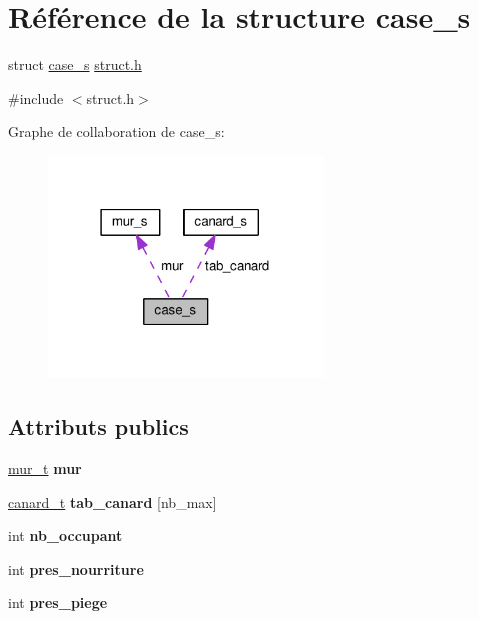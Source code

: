 \hypertarget{structcase__s}{}\section{Référence de la structure case\+\_\+s}
\label{structcase__s}


struct \hyperlink{structcase__s}{case\+\_\+s} \hyperlink{struct_8h_source}{struct.\+h}  




{\ttfamily \#include $<$struct.\+h$>$}



Graphe de collaboration de case\+\_\+s\+:
\nopagebreak
\begin{figure}[H]
\begin{center}
\leavevmode
\includegraphics[width=207pt]{structcase__s__coll__graph}
\end{center}
\end{figure}
\subsection*{Attributs publics}
\begin{DoxyCompactItemize}
\item 
\hyperlink{structmur__s}{mur\+\_\+t} {\bfseries mur}\hypertarget{structcase__s_abdc07d37e4d9b61e001331ade6b389ea}{}\label{structcase__s_abdc07d37e4d9b61e001331ade6b389ea}

\item 
\hyperlink{structcanard__s}{canard\+\_\+t} {\bfseries tab\+\_\+canard} \mbox{[}nb\+\_\+max\mbox{]}\hypertarget{structcase__s_aae0820a1cce02a09249c9078bd50d4e8}{}\label{structcase__s_aae0820a1cce02a09249c9078bd50d4e8}

\item 
int {\bfseries nb\+\_\+occupant}\hypertarget{structcase__s_a3afb11c4122087e0686451fbaefebb2e}{}\label{structcase__s_a3afb11c4122087e0686451fbaefebb2e}

\item 
int {\bfseries pres\+\_\+nourriture}\hypertarget{structcase__s_a550d1707850b0078d6bad63cdce01fa3}{}\label{structcase__s_a550d1707850b0078d6bad63cdce01fa3}

\item 
int {\bfseries pres\+\_\+piege}\hypertarget{structcase__s_a8ac60b2215c63b94f4d83fd4085bbda5}{}\label{structcase__s_a8ac60b2215c63b94f4d83fd4085bbda5}

\end{DoxyCompactItemize}


